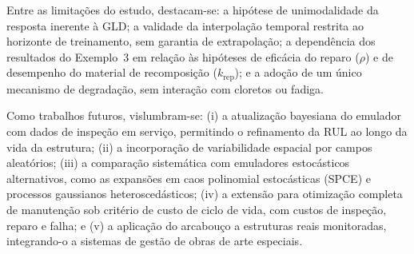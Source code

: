 Entre as limitações do estudo, destacam-se: a hipótese de unimodalidade da resposta inerente à GLD; a validade da interpolação temporal restrita ao horizonte de treinamento, sem garantia de extrapolação; a dependência dos resultados do Exemplo~3 em relação às hipóteses de eficácia do reparo ($\rho$) e de desempenho do material de recomposição ($k_{\mathrm{rep}}$); e a adoção de um único mecanismo de degradação, sem interação com cloretos ou fadiga.

Como trabalhos futuros, vislumbram-se: (i) a atualização bayesiana do emulador com dados de inspeção em serviço, permitindo o refinamento da RUL ao longo da vida da estrutura; (ii) a incorporação de variabilidade espacial por campos aleatórios; (iii) a comparação sistemática com emuladores estocásticos alternativos, como as expansões em caos polinomial estocásticas (SPCE) e processos gaussianos heteroscedásticos; (iv) a extensão para otimização completa de manutenção sob critério de custo de ciclo de vida, com custos de inspeção, reparo e falha; e (v) a aplicação do arcabouço a estruturas reais monitoradas, integrando-o a sistemas de gestão de obras de arte especiais.
